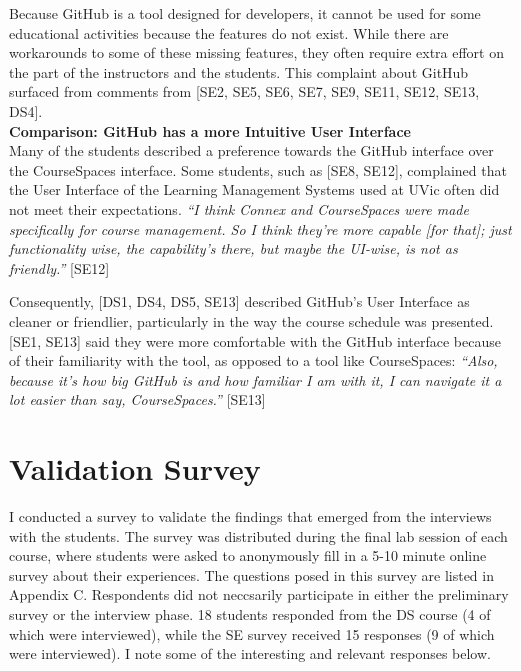 Because GitHub is a tool designed for developers, it cannot be used for some educational activities because the features do not exist. While there are workarounds to some of these missing features, they often require extra effort on the part of the instructors and the students. This complaint about GitHub surfaced from comments from [SE2, SE5, SE6, SE7, SE9, SE11, SE12, SE13, DS4]. \\

\textbf{Comparison: GitHub has a more Intuitive User Interface} \\
Many of the students described a preference towards the GitHub interface over the CourseSpaces interface. Some students, such as [SE8, SE12], complained that the User Interface of the Learning Management Systems used at UVic often did not meet their expectations. \textit{``I think Connex and CourseSpaces were made specifically for course management. So I think they're more capable [for that]; just functionality wise, the capability's there, but maybe the UI-wise, is not as friendly.''} [SE12]

Consequently, [DS1, DS4, DS5, SE13] described GitHub's User Interface as cleaner or friendlier, particularly in the way the course schedule was presented. [SE1, SE13] said they were more comfortable with the GitHub interface because of their familiarity with the tool, as opposed to a tool like CourseSpaces: \textit{``Also, because it's how big GitHub is and how familiar I am with it, I can navigate it a lot easier than say, CourseSpaces.''} [SE13]


\section{Validation Survey}
I conducted a survey to validate the findings that emerged from the interviews with the students. The survey was distributed during the final lab session of each course, where students were asked to anonymously fill in a 5-10 minute online survey about their experiences. The questions posed in this survey are listed in Appendix C. Respondents did not neccsarily participate in either the preliminary survey or the interview phase. 18 students responded from the DS course (4 of which were interviewed), while the SE survey received 15 responses (9 of which were interviewed). I note some of the interesting and relevant responses below.

